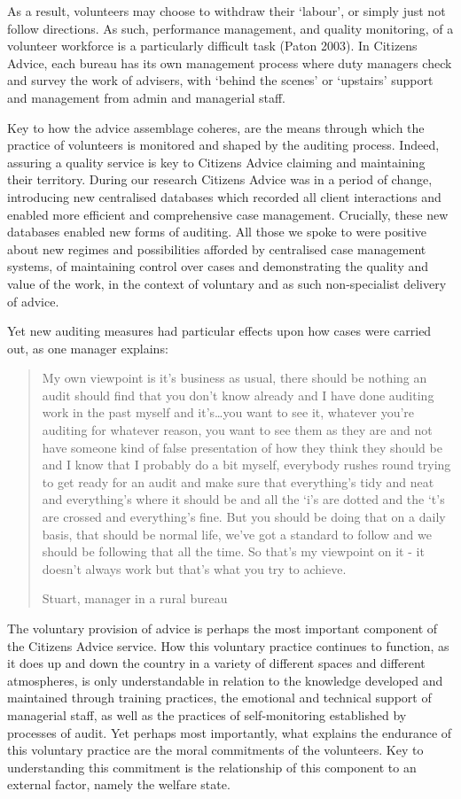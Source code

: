 As a result, volunteers may choose to withdraw their ‘labour’, or simply just not follow directions. As such, performance management, and quality monitoring, of a volunteer workforce is a particularly difficult task (Paton 2003). In Citizens Advice, each bureau has its own management process where duty managers check and survey the work of advisers, with ‘behind the scenes’ or ‘upstairs’ support and management from admin and managerial staff. 
\par
Key to how the advice assemblage coheres, are the means through which the practice of volunteers is monitored and shaped by the auditing process. Indeed, assuring a quality service is key to Citizens Advice claiming and maintaining their territory. During our research Citizens Advice was in a period of change, introducing new centralised databases which recorded all client interactions and enabled more efficient and comprehensive case management. Crucially, these new databases enabled new forms of auditing. All those we spoke to were positive about new regimes and possibilities afforded by centralised case management systems, of maintaining control over cases and demonstrating the quality and value of the work, in the context of voluntary and as such non-specialist delivery of advice.
\par
Yet new auditing measures had particular effects upon how cases were carried out, as one manager explains:
    \blockquote[Stuart, manager in a rural bureau]{My own viewpoint is it’s business as usual, there should be nothing an audit should find that you don’t know already and I have done auditing work in the past myself and it’s…you want to see it, whatever you’re auditing for whatever reason, you want to see them as they are and not have someone kind of false presentation of how they think they should be and I know that I probably do a bit myself, everybody rushes round trying to get ready for an audit and make sure that everything’s tidy and neat and everything’s where it should be and all the ‘i’s are dotted and the ‘t’s are crossed and everything’s fine.  But you should be doing that on a daily basis, that should be normal life, we’ve got a standard to follow and we should be following that all the time.  So that’s my viewpoint on it - it doesn’t always work but that’s what you try to achieve.}
The voluntary provision of advice is perhaps the most important component of the Citizens Advice service. How this voluntary practice continues to function, as it does up and down the country in a variety of different spaces and different atmospheres, is only understandable in relation to the knowledge developed and maintained through training practices, the emotional and technical support of managerial staff, as well as the practices of self-monitoring established by processes of audit. Yet perhaps most importantly, what explains the endurance of this voluntary practice are the moral commitments of the volunteers. Key to understanding this commitment is the relationship of this component to an external factor, namely the welfare state. 
